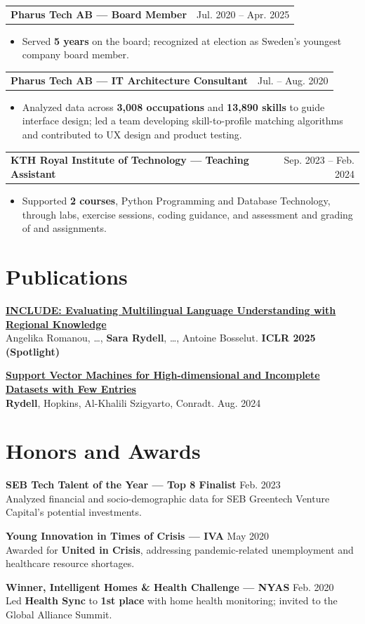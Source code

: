\documentclass{ExpressiveResume}
\makeatletter
\newcommand{\resumeentry}[3]{%
    \par\addvspace{3pt}\Needspace{3\baselineskip}%
    \noindent\begin{tabularx}{\linewidth}{@{}X r@{}}
        \textbf{#1 --- #2} & {\small #3}
    \end{tabularx}\par
}
\renewcommand{\achievement}[1]{%
    \begin{itemize}\item #1\end{itemize}\vspace{1pt}%
}
\makeatother
\begin{document}
\resumeentry{Pharus Tech AB}{Board Member}{Jul. 2020 -- Apr. 2025}
\achievement{Served \textbf{5 years} on the board; recognized at election
as Sweden's youngest company board member.}
\resumeentry{Pharus Tech AB}{IT Architecture Consultant}{Jul. -- Aug. 2020}
\achievement{Analyzed  data across \textbf{3,008 occupations} and \textbf{13,890 skills}
to guide interface design; led a team developing skill-to-profile matching
algorithms and contributed to UX design and product testing.}

\resumeentry{KTH Royal Institute of Technology}{Teaching Assistant}{Sep. 2023 -- Feb. 2024}
\achievement{Supported \textbf{2 courses}, Python Programming and Database Technology,
through labs, exercise sessions, coding guidance, and assessment and grading of
\tech{Python} and \tech{SQL} assignments.}

\section{Publications}
\textbf{\href{https://proceedings.iclr.cc/paper_files/paper/2025/hash/ced46a50befedcb884ccf0cbe8c3ad23-Abstract-Conference.html}{INCLUDE: Evaluating Multilingual Language Understanding with Regional Knowledge}}\\
Angelika Romanou, \ldots, \textbf{Sara Rydell}, \ldots, Antoine Bosselut.
\hfill \textbf{ICLR 2025 (Spotlight)}
\par\vspace{2pt}
\textbf{\href{https://kth-my.sharepoint.com/:b:/g/personal/sryde_ug_kth_se/ET3Dv7v4t0NFoMeeCFlWsocB7MEQH2LLglb5x2O56XQChg?e=Xzcd7b}{Support Vector Machines for High-dimensional and Incomplete Datasets with Few Entries}}\\
\textbf{Rydell}, Hopkins, Al-Khalili Szigyarto, Conradt. \hfill Aug. 2024

\section{Honors and Awards}
\textbf{SEB Tech Talent of the Year --- Top 8 Finalist} \hfill Feb. 2023\\
Analyzed financial and socio-demographic data for SEB Greentech Venture Capital's potential investments.
\par\vspace{2pt}
\textbf{Young Innovation in Times of Crisis --- IVA} \hfill May 2020\\
Awarded for \textbf{United in Crisis}, addressing pandemic-related unemployment and healthcare resource shortages.
\par\vspace{2pt}
\textbf{Winner, Intelligent Homes \& Health Challenge --- NYAS} \hfill Feb. 2020\\
Led \textbf{Health Sync} to \textbf{1st place} with home health monitoring; invited to the Global Alliance Summit.
\end{document}

